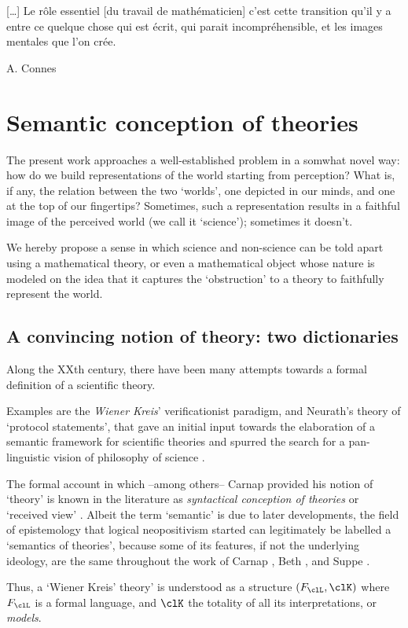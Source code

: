 \epigraph{[\dots\unkern] Le rôle essentiel [du travail de mathématicien] c'est cette transition qu'il y a entre ce quelque chose qui est écrit, qui parait incompréhensible, et les images mentales que l'on crée.}{A. Connes}
\section{Semantic conception of theories}\label{sec_1_intro}
The present work approaches a well-established problem in a somwhat novel way: how do we build representations of the world starting from perception? What is, if any, the relation between the two `worlds', one depicted in our minds, and one at the top of our fingertips? Sometimes, such a representation results in a faithful image of the perceived world (we call it `science'); sometimes it doesn't.

We hereby propose a sense in which science and non-science can be told apart using a mathematical theory, or even a mathematical object whose nature is modeled on the idea that it captures the `obstruction' to a theory to faithfully represent the world.
\subsection{A convincing notion of theory: two dictionaries}
Along the XXth century, there have been many attempts towards a formal definition of a scientific theory.

Examples are the \emph{Wiener Kreis}' verificationist paradigm, and Neurath's theory of `protocol statements', that gave an initial input towards the elaboration of a semantic framework for scientific theories and spurred the search for a pan-linguistic vision of philosophy of science \cite{Weinb}.

The formal account in which --among others-- Carnap \cite{carnapfound} provided his notion of `theory' is known in the literature as \emph{syntactical conception of theories} or `received view' \cite{krause-foundation,krause2011axiomatization,giunti2016}. Albeit the term `semantic' is due to later developments, the field of epistemology that logical neopositivism started can legitimately be labelled a `semantics of theories', because some of its features, if not the underlying ideology, are the same throughout the work of Carnap \cite{carnap56,carnapfound},  Beth \cite{beth1961semantics}, and Suppe \cite{suppe89}.

Thus, a `Wiener Kreis' theory' is understood as a structure $(F_\clL, \clK)$ where $F_\clL$ is a formal language, and $\clK$ the totality of all its interpretations, or \emph{models}.

